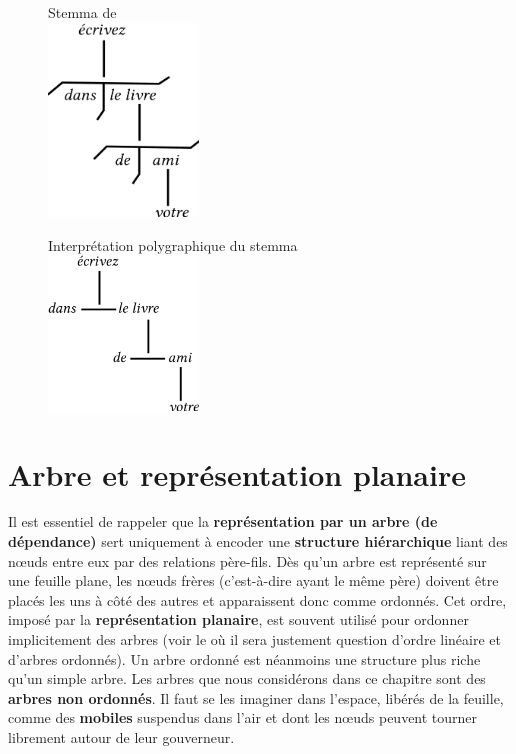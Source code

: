 {    \begin{figure}
    \begin{minipage}[t]{.4\textwidth}\centering
    Stemma de \citet{Tesnière1959}\medskip\\
    \includegraphics[width=4cm]{figures/StemmadeTesniere}
    \end{minipage}%
    \begin{minipage}[t]{.6\textwidth}\centering
    Interprétation polygraphique du stemma\medskip\\
    \includegraphics[width=4cm]{figures/Stemma}
    \end{minipage}
    \end{figure}
}
\section{Arbre et représentation planaire}\label{sec:3.3.6}

Il est essentiel de rappeler que la \textbf{représentation par un arbre (de} \textbf{dépendance)} sert uniquement à encoder une \textbf{structure hiérarchique} liant des nœuds entre eux par des relations père-fils. Dès qu’un arbre est représenté sur une feuille plane, les nœuds frères (c’est-à-dire ayant le même père) doivent être placés les uns à côté des autres et apparaissent donc comme ordonnés. Cet ordre, imposé par la \textbf{représentation planaire}, est souvent utilisé pour ordonner implicitement des arbres (voir le  où il sera justement question d’ordre linéaire et d’arbres ordonnés). Un arbre ordonné est néanmoins une structure plus riche qu’un simple arbre. Les arbres que nous considérons dans ce chapitre sont des \textbf{arbres non ordonnés}. Il faut se les imaginer dans l’espace, libérés de la feuille, comme des \textbf{mobiles} suspendus dans l’air et dont les nœuds peuvent tourner librement autour de leur gouverneur.

